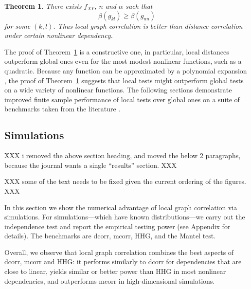 \documentclass[11pt]{article}
\newtheorem{thm}{Theorem}
\begin{document}
\begin{thm}
\label{thm3}
There exists $f_{XY}$, $n$ and $\alpha$ such that 
\begin{equation}
\label{equ2}
\beta(g_{kl}) \geq \beta(g_{nn})
\end{equation}
for some $(k,l)$.
Thus local graph correlation is better than distance correlation under certain nonlinear dependency.
\end{thm}
The proof of Theorem~\ref{thm3} is a constructive one, in particular, local distances outperform global ones even for the most modest nonlinear functions, such as a quadratic.  Because any function can be approximated by a polynomial expansion \cite{XXX}, the proof of Theorem~\ref{thm3} suggests that local tests might outperform global tests on a wide variety of nonlinear functions.  The following sections demonstrate improved finite sample performance of local tests over global ones on a suite of benchmarks taken from the literature \cite{SzekelyRizzoBakirov2007, SimonTibshirani2012, GorfineHellerHeller2012, HellerGorfine2013}.




\subsection{Simulations}
\label{numer1}

XXX i removed the above section heading, and moved the below 2 paragraphs, because the journal wants a single ``results'' section.  XXX

XXX some of the text needs to be fixed given the current ordering of the figures. XXX

In this section we show the numerical advantage of local graph correlation via simulations. For simulations---which have known distributions---we carry out the independence test and report the empirical testing power (see Appendix for details). The benchmarks are dcorr, mcorr, HHG, and the Mantel test. 

Overall, we observe that local graph correlation combines the best aspects of dcorr, mcorr and HHG: it performs similarly to dcorr for dependencies that are close to linear, yields similar or better power than HHG in most nonlinear dependencies, and outperforms mcorr in high-dimensional simulations. 
\end{document}
